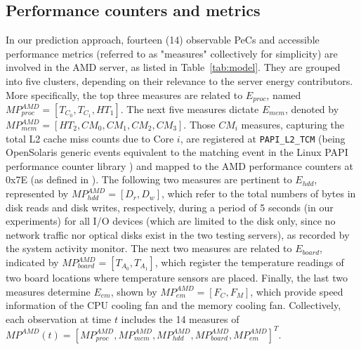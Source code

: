 \documentclass[acmtaco]{acmtrans2m}
\begin{document}
\subsection{Performance counters and metrics}
\label{sec:variables}
In our prediction approach, fourteen (14) observable PeCs and accessible
performance metrics (referred to as "measures" collectively for simplicity)
are involved in the AMD server, as listed in Table~\ref{tab:model}.
They are grouped into five clusters, depending on their relevance to the
server energy contributors.  More specifically, the top three measures
are related to $E_{proc}$, named $MP_{proc}^{AMD} = \left[T_{C_{0}},
  T_{C_{1}}, HT_{1}\right]$.  The next five measures dictate $E_{mem}$,
denoted by $MP_{mem}^{AMD} = \left[HT_{2}, CM_{0}, CM_{1}, CM_{2},
  CM_{3}\right]$.  Those $CM_i$ measures, capturing the total L2 cache
miss counts due to Core $i$, are registered at \texttt{PAPI\_L2\_TCM} (being
OpenSolaris generic events equivalent to the matching event in the Linux
PAPI performance counter library \cite{London2001}) and mapped to the
AMD performance counters at 0x7E (as defined in \cite{AMD2008}).  The
following two measures are pertinent to $E_{hdd}$, represented by
$MP_{hdd}^{AMD} = \left[D_{r}, D_{w}\right]$, which refer to the total
numbers of bytes in disk reads and disk writes, respectively, during a
period of 5 seconds (in our experiments) for all I/O devices (which are
limited to the disk only, since no network traffic nor optical disks
exist in the two testing servers), as recorded by the system activity
monitor.  The next two measures are related to $E_{board}$, indicated by
$MP_{board}^{AMD} = \left[T_{A_0}, T_{A_1}\right]$, which register the
temperature readings of two board locations where temperature sensors
are placed.  Finally, the last two measures determine $E_{em}$, shown by
$MP_{em}^{AMD} = \left[F_C, F_M\right]$, which provide speed information
of the CPU cooling fan and the memory cooling fan.  Collectively, each
observation at time $t$ includes the 14 measures of $MP^{AMD}(t) =
\left[MP_{proc}^{AMD}, MP_{mem}^{AMD}, MP_{hdd}^{AMD},
  MP_{board}^{AMD},MP_{em}^{AMD}\right]^{T}$.
\end{document}
